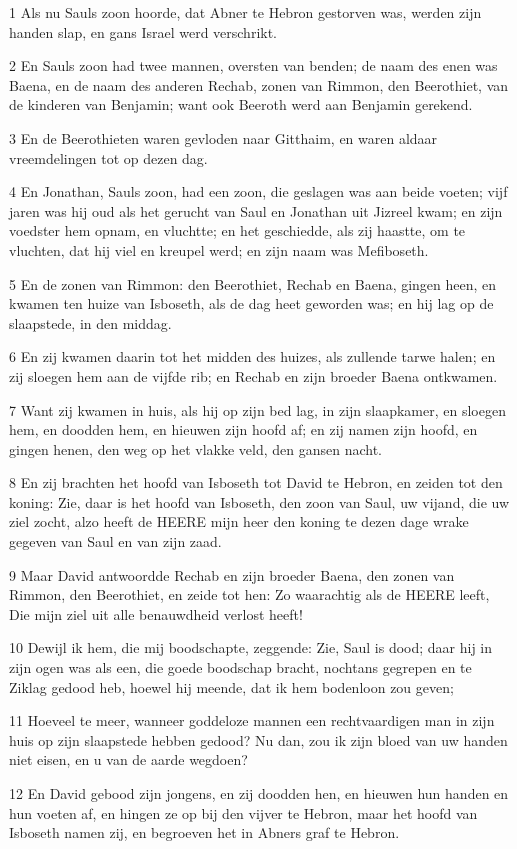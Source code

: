 \par 1 Als nu Sauls zoon hoorde, dat Abner te Hebron gestorven was, werden zijn handen slap, en gans Israel werd verschrikt.
\par 2 En Sauls zoon had twee mannen, oversten van benden; de naam des enen was Baena, en de naam des anderen Rechab, zonen van Rimmon, den Beerothiet, van de kinderen van Benjamin; want ook Beeroth werd aan Benjamin gerekend.
\par 3 En de Beerothieten waren gevloden naar Gitthaim, en waren aldaar vreemdelingen tot op dezen dag.
\par 4 En Jonathan, Sauls zoon, had een zoon, die geslagen was aan beide voeten; vijf jaren was hij oud als het gerucht van Saul en Jonathan uit Jizreel kwam; en zijn voedster hem opnam, en vluchtte; en het geschiedde, als zij haastte, om te vluchten, dat hij viel en kreupel werd; en zijn naam was Mefiboseth.
\par 5 En de zonen van Rimmon: den Beerothiet, Rechab en Baena, gingen heen, en kwamen ten huize van Isboseth, als de dag heet geworden was; en hij lag op de slaapstede, in den middag.
\par 6 En zij kwamen daarin tot het midden des huizes, als zullende tarwe halen; en zij sloegen hem aan de vijfde rib; en Rechab en zijn broeder Baena ontkwamen.
\par 7 Want zij kwamen in huis, als hij op zijn bed lag, in zijn slaapkamer, en sloegen hem, en doodden hem, en hieuwen zijn hoofd af; en zij namen zijn hoofd, en gingen henen, den weg op het vlakke veld, den gansen nacht.
\par 8 En zij brachten het hoofd van Isboseth tot David te Hebron, en zeiden tot den koning: Zie, daar is het hoofd van Isboseth, den zoon van Saul, uw vijand, die uw ziel zocht, alzo heeft de HEERE mijn heer den koning te dezen dage wrake gegeven van Saul en van zijn zaad.
\par 9 Maar David antwoordde Rechab en zijn broeder Baena, den zonen van Rimmon, den Beerothiet, en zeide tot hen: Zo waarachtig als de HEERE leeft, Die mijn ziel uit alle benauwdheid verlost heeft!
\par 10 Dewijl ik hem, die mij boodschapte, zeggende: Zie, Saul is dood; daar hij in zijn ogen was als een, die goede boodschap bracht, nochtans gegrepen en te Ziklag gedood heb, hoewel hij meende, dat ik hem bodenloon zou geven;
\par 11 Hoeveel te meer, wanneer goddeloze mannen een rechtvaardigen man in zijn huis op zijn slaapstede hebben gedood? Nu dan, zou ik zijn bloed van uw handen niet eisen, en u van de aarde wegdoen?
\par 12 En David gebood zijn jongens, en zij doodden hen, en hieuwen hun handen en hun voeten af, en hingen ze op bij den vijver te Hebron, maar het hoofd van Isboseth namen zij, en begroeven het in Abners graf te Hebron.

